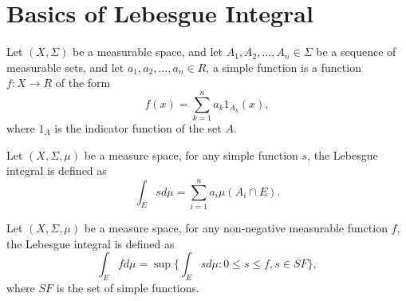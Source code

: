 \section{Basics of Lebesgue Integral}

\begin{definition}
Let $(X,\Sigma)$ be a measurable space, and let $A_1,A_2,\dots,A_n\in \Sigma$
be a sequence of measurable sets, and let $a_1,a_2,\dots,a_n\in R$, a 
simple function is a function $f:X\to R$ of the form
\begin{equation}
  f(x)= \sum_{k=1}^n a_k 1_{A_k}(x),
\end{equation}
where $1_A$ is the indicator function of the set $A$.
\end{definition}

\begin{definition}
Let $(X,\Sigma,\mu)$ be a measure space, for any simple function $s$, 
the Lebesgue integral is defined as
\begin{equation}
  \int_E s d\mu = \sum_{i=1}^n a_i \mu(A_i \cap E).
\end{equation}
\end{definition}

\begin{definition}
Let $(X,\Sigma,\mu)$ be a measure space, 
for any non-negative measurable function $f$, the Lebesgue integral is defined
as
\begin{equation}
  \int_E f d\mu = \sup \{ \int_E s d\mu: 0\le s\le f, s \in SF \},
\end{equation}
where $SF$ is the set of simple functions.
\end{definition}

